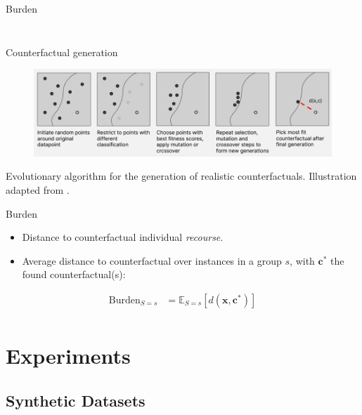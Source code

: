 \documentclass[handout,aspectratio=169]{beamer}
\begin{document}
\begin{frame}{Burden}
\begin{columns}
\begin{column}{0.5\textwidth}
\begin{figure}
            \end{figure}
        \end{column}
    \end{columns}
    
\end{frame}

\begin{frame}{Counterfactual generation}
    \begin{figure}
    \centering
    \includegraphics[width=\textwidth]{img/counterfactual_generation_burden.png}
    \end{figure}
    Evolutionary algorithm for the generation of realistic counterfactuals. Illustration adapted from \cite{certifai}.
\end{frame}

\begin{frame}{Burden}
    \begin{itemize}
        \item Distance to counterfactual \textrightarrow individual \emph{recourse}.
        \item Average distance to counterfactual over instances in a group $s$, with $\mathbf{c^*}$ the found counterfactual(s):
    \end{itemize}
    \begin{align*}\label{eq:burden}
        \text{Burden}_{S=s} &= \mathbb{E}_{S=s}[d(\mathbf{x}, \mathbf{c^*})] \\
    \end{align*}
\end{frame}


\section{Experiments}
\subsection{Synthetic Datasets}
\end{document}

